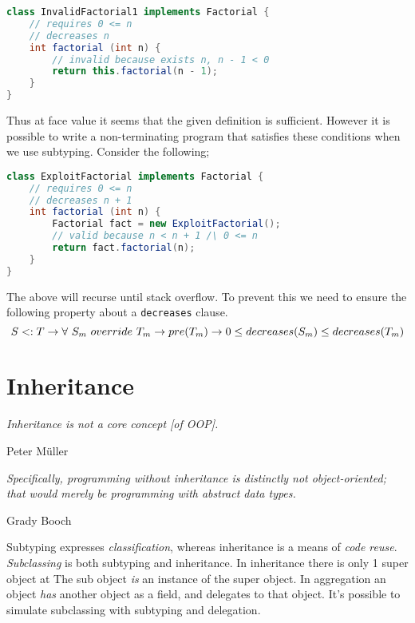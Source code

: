 \documentclass{article}
\begin{document}
\begin{example}
\begin{lstlisting}[language=Java, escapechar=|]
class InvalidFactorial1 implements Factorial {
    // requires 0 <= n
    // decreases n
    int factorial (int n) {
        // invalid because exists n, n - 1 < 0
        return this.factorial(n - 1);
    }
}
\end{lstlisting}
  Thus at face value it seems that the given definition is sufficient.
  However it is possible to write a non-terminating program that satisfies these conditions when we use subtyping.
  Consider the following;
\begin{lstlisting}[language=Java, escapechar=|]
class ExploitFactorial implements Factorial {
    // requires 0 <= n
    // decreases n + 1
    int factorial (int n) {
        Factorial fact = new ExploitFactorial();
        // valid because n < n + 1 /\ 0 <= n
        return fact.factorial(n);
    }
}
\end{lstlisting}
  The above will recurse until stack overflow.
  To prevent this we need to ensure the following property about a \texttt{decreases} clause.
  $$S <: T \rightarrow \forall ~ S_m ~ override{} ~ T_m \rightarrow pre(T_m) \rightarrow 0 \leq decreases(S_m) \leq decreases(T_m)$$
\end{example}

\section{Inheritance}

\epigraph{\itshape Inheritance is not a core concept [of OOP].}{Peter M\"uller}

\epigraph{\itshape Specifically, programming without inheritance is distinctly not object-oriented; that would merely be programming with abstract data types.}{Grady Booch}

Subtyping expresses \textit{classification}, whereas inheritance is a means of \textit{code reuse}. \textit{Subclassing} is both subtyping and inheritance. In inheritance there is only 1 super object at \runtime{} The sub object \textit{is} an instance of the super object. In aggregation an object \textit{has} another object as a field, and delegates to that object. It's possible to simulate subclassing with subtyping and delegation.
\end{document}
